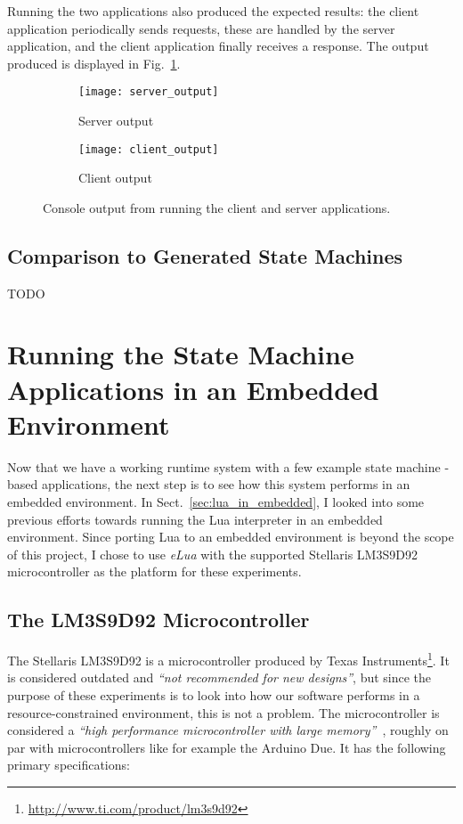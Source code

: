 Running the two applications also produced the expected results: the client application periodically sends requests, these are handled by the server application, and the client application finally receives a response. The output produced is displayed in Fig.~\ref{fig:client_server_output}.

\begin{figure}[htp]
	\centering
	\begin{subfigure}[b]{.4\textwidth}
		\texttt{[image: server\_output]}
		\caption{Server output}
	\end{subfigure}
	\quad
	\begin{subfigure}[b]{.4\textwidth}
		\texttt{[image: client\_output]}
		\caption{Client output}
	\end{subfigure}
	\caption[Output of Client - Server test run (desktop)]{Console output from running the client and server applications.}
	\label{fig:client_server_output}
\end{figure}

\FloatBarrier
\subsection{Comparison to Generated State Machines}
TODO


\section{Running the State Machine Applications in an Embedded Environment}
\label{sec:running_on_micro}
Now that we have a working runtime system with a few example state machine -based applications, the next step is to see how this system performs in an embedded environment. In Sect.~\ref{sec:lua_in_embedded}, I looked into some previous efforts towards running the Lua interpreter in an embedded environment. Since porting Lua to an embedded environment is beyond the scope of this project, I chose to use \emph{eLua} with the supported Stellaris LM3S9D92 microcontroller as the platform for these experiments.

\subsection{The LM3S9D92 Microcontroller}
\label{sec:microcontroller}
The Stellaris LM3S9D92 is a microcontroller produced by Texas Instruments\footnote{\url{http://www.ti.com/product/lm3s9d92}}. It is considered outdated and \emph{``not recommended for new designs''}, but since the purpose of these experiments is to look into how our software performs in a resource-constrained environment, this is not a problem. The microcontroller is considered a \emph{``high performance microcontroller with large memory''}~\cite{website:stellaris_micro}, roughly on par with microcontrollers like for example the Arduino Due. It has the following primary specifications:

